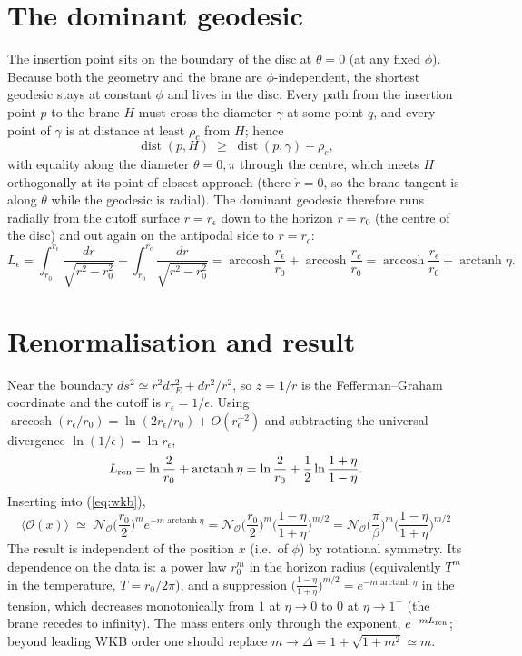 \documentclass[11pt]{article}
\newcommand{\arctanh}{\operatorname{arctanh}}
\newcommand{\arccosh}{\operatorname{arccosh}}
\begin{document}
\section{The dominant geodesic}
The insertion point sits on the boundary of the disc at $\theta=0$ (at any fixed $\phi$). Because both the geometry and the brane are $\phi$-independent, the shortest geodesic stays at constant $\phi$ and lives in the disc. Every path from the insertion point $p$ to the brane $H$ must cross the diameter $\gamma$ at some point $q$, and every point of $\gamma$ is at distance at least $\rho_c$ from $H$; hence
\begin{equation}
\operatorname{dist}(p,H)\;\ge\;\operatorname{dist}(p,\gamma)+\rho_c ,
\end{equation}
with equality along the diameter $\theta=0,\pi$ through the centre, which meets $H$ orthogonally at its point of closest approach (there $\dot r=0$, so the brane tangent is along $\theta$ while the geodesic is radial). The dominant geodesic therefore runs radially from the cutoff surface $r=r_\epsilon$ down to the horizon $r=r_0$ (the centre of the disc) and out again on the antipodal side to $r=r_c$:
\begin{equation}
L_\epsilon=\int_{r_0}^{r_\epsilon}\frac{dr}{\sqrt{r^2-r_0^2}}+\int_{r_0}^{r_c}\frac{dr}{\sqrt{r^2-r_0^2}}
=\arccosh\frac{r_\epsilon}{r_0}+\arccosh\frac{r_c}{r_0}
=\arccosh\frac{r_\epsilon}{r_0}+\arctanh\eta .
\end{equation}

\section{Renormalisation and result}
Near the boundary $ds^2\simeq r^2d\tau_E^2+dr^2/r^2$, so $z=1/r$ is the Fefferman--Graham coordinate and the cutoff is $r_\epsilon=1/\epsilon$. Using $\arccosh(r_\epsilon/r_0)=\ln(2r_\epsilon/r_0)+O(r_\epsilon^{-2})$ and subtracting the universal divergence $\ln(1/\epsilon)=\ln r_\epsilon$,
\begin{equation}
L_{\rm ren}=\ln\frac{2}{r_0}+\arctanh\eta=\ln\frac{2}{r_0}+\frac12\ln\frac{1+\eta}{1-\eta}.
\end{equation}
Inserting into (\ref{eq:wkb}),
\begin{equation}
\boxed{\;\langle\mathcal O(x)\rangle\;\simeq\;\mathcal N_{\mathcal O}\Big(\frac{r_0}{2}\Big)^{m}e^{-m\arctanh\eta}
=\mathcal N_{\mathcal O}\Big(\frac{r_0}{2}\Big)^{m}\Big(\frac{1-\eta}{1+\eta}\Big)^{m/2}
=\mathcal N_{\mathcal O}\Big(\frac{\pi}{\beta}\Big)^{m}\Big(\frac{1-\eta}{1+\eta}\Big)^{m/2}\;}
\end{equation}
The result is independent of the position $x$ (i.e.\ of $\phi$) by rotational symmetry. Its dependence on the data is: a power law $r_0^{m}$ in the horizon radius (equivalently $T^{m}$ in the temperature, $T=r_0/2\pi$), and a suppression $\big(\frac{1-\eta}{1+\eta}\big)^{m/2}=e^{-m\arctanh\eta}$ in the tension, which decreases monotonically from $1$ at $\eta\to0$ to $0$ at $\eta\to1^-$ (the brane recedes to infinity). The mass enters only through the exponent, $e^{-mL_{\rm ren}}$; beyond leading WKB order one should replace $m\to\Delta=1+\sqrt{1+m^2}\simeq m$.
\end{document}
